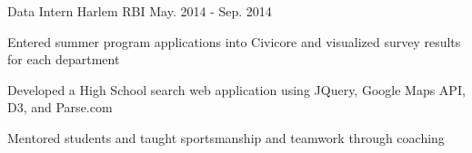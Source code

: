 \begin{cventries}
\iffalse
  \cventry
    {IT Assistant} %
    {CCNY Tech Center} %
	{Sep. 2014 - Oct. 2014} %
    {} %
    {
      \begin{cvitems} %
        \item {Assisted students login and print issues}
        \item {Managed reservations for the study rooms}
        \item {Performed maintenance and troubleshooting on lab computers}
      \end{cvitems}
    }
\fi

\iftrue
  \cventry
    {Data Intern} %
    {Harlem RBI} %
	{May. 2014 - Sep. 2014} %
    {} %
    {
      \begin{cvitems} %
        \item {Entered summer program applications into Civicore and visualized survey results for each department}
        \item {Developed a High School search web application using JQuery, Google Maps API, D3, and Parse.com}
        \item {Mentored students and taught sportsmanship and teamwork through coaching}
      \end{cvitems}
    }
\fi


\end{cventries}
